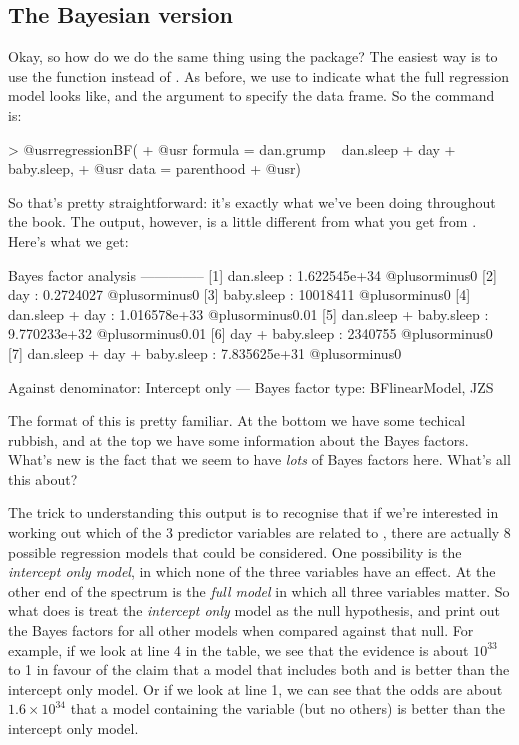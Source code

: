 \subsection{The Bayesian version}

Okay, so how do we do the same thing using the  package? The easiest way is to use the  function instead of . As before, we use  to indicate what the full regression model looks like, and the  argument to specify the data frame. So the command is:

\begin{rblock1}
> @usr{regressionBF(}
+ @usr{   formula = dan.grump ~ dan.sleep + day + baby.sleep,}
+ @usr{   data = parenthood}
+ @usr{)}
\end{rblock1}

\noindent
So that's pretty straightforward: it's exactly what we've been doing throughout the book. The output, however, is a little different from what you get from . Here's what we get:

\begin{rblock1}
Bayes factor analysis
--------------
[1] dan.sleep                    : 1.622545e+34 @plusorminus0%
[2] day                          : 0.2724027    @plusorminus0%
[3] baby.sleep                   : 10018411     @plusorminus0%
[4] dan.sleep + day              : 1.016578e+33 @plusorminus0.01%
[5] dan.sleep + baby.sleep       : 9.770233e+32 @plusorminus0.01%
[6] day + baby.sleep             : 2340755      @plusorminus0%
[7] dan.sleep + day + baby.sleep : 7.835625e+31 @plusorminus0%

Against denominator:
  Intercept only 
---
Bayes factor type: BFlinearModel, JZS
\end{rblock1}
The format of this is pretty familiar. At the bottom we have some techical rubbish, and at the top we have some information about the Bayes factors. What's new is the fact that we seem to have {\it lots} of Bayes factors here. What's all this about?

The trick to understanding this output is to recognise that if we're interested in working out which of the 3 predictor variables are related to , there are actually 8 possible regression models that could be considered. One possibility is the {\it intercept only model}, in which none of the three variables have an effect. At the other end of the spectrum is the {\it full model} in which all three variables matter. So what  does is treat the {\it intercept only} model as the null hypothesis, and print out the Bayes factors for all other models when compared against that null. For example, if we look at line 4 in the table, we see that the evidence is about $10^{33}$ to 1 in favour of the claim that a model that includes both  and  is better than the intercept only model. Or if we look at line 1, we can see that the odds are about $1.6 \times 10^{34}$ that a model containing the  variable (but no others) is better than the intercept only model.


